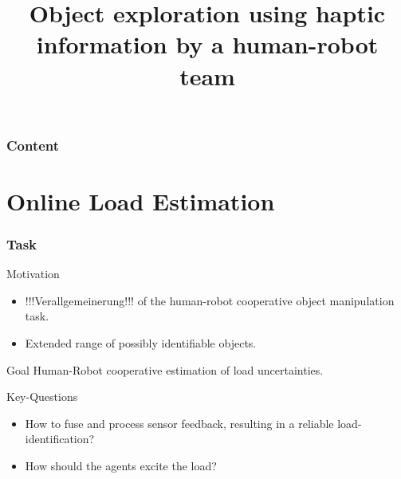 \documentclass[student,noshadow]{ITRslides}
\title{Object exploration using haptic information by a human-robot team}
\begin{document}
\begin{frame}
	\titlepage
\end{frame}

\begin{frame}
	\frametitle{Content}
	\tableofcontents
\end{frame}

\section{Online Load Estimation}

\begin{frame}
	\frametitle{Task}
	
	\begin{block}{Motivation}
		\begin{itemize}
			\item !!!Verallgemeinerung!!! of the human-robot cooperative object manipulation task.
			\item Extended range of possibly identifiable objects.
		\end{itemize}
	\end{block}
	
	\begin{block}{Goal}
		Human-Robot cooperative estimation of load uncertainties.
	\end{block}
	\vspace{2mm}
	\begin{block}{Key-Questions}
		\begin{itemize}
			\item How to fuse and process sensor feedback, resulting in a reliable load-identification?
			\item How should the agents excite the load?
		\end{itemize}	   
	\end{block}	
\end{frame}
\end{document}
